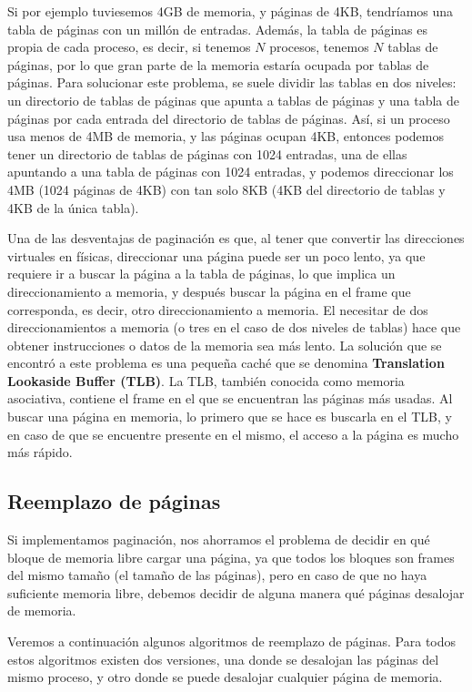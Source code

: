 \documentclass{article}
\begin{document}
Si por ejemplo tuviesemos 4GB de memoria, y p\'aginas de 4KB, tendr\'iamos una tabla de p\'aginas con un mill\'on de entradas. Adem\'as, la tabla de p\'aginas es propia de cada proceso, es decir, si tenemos $N$ procesos, tenemos $N$ tablas de p\'aginas, por lo que gran parte de la memoria estar\'ia ocupada por tablas de p\'aginas. Para solucionar este problema, se suele dividir las tablas en dos niveles: un directorio de tablas de p\'aginas que apunta a tablas de p\'aginas y una tabla de p\'aginas por cada entrada del directorio de tablas de p\'aginas. As\'i, si un proceso usa menos de 4MB de memoria, y las p\'aginas ocupan 4KB, entonces podemos tener un directorio de tablas de p\'aginas con 1024 entradas, una de ellas apuntando a una tabla de p\'aginas con 1024 entradas, y podemos direccionar los 4MB (1024 p\'aginas de 4KB) con tan solo 8KB (4KB del directorio de tablas y 4KB de la \'unica tabla).

Una de las desventajas de paginaci\'on es que, al tener que convertir las direcciones virtuales en f\'isicas, direccionar una p\'agina puede ser un poco lento, ya que requiere ir a buscar la p\'agina a la tabla de p\'aginas, lo que implica un direccionamiento a memoria, y despu\'es buscar la p\'agina en el frame que corresponda, es decir, otro direccionamiento a memoria. El necesitar de dos direccionamientos a memoria (o tres en el caso de dos niveles de tablas) hace que obtener instrucciones o datos de la memoria sea m\'as lento. La soluci\'on que se encontr\'o a este problema es una peque\~na cach\'e que se denomina \textbf{Translation Lookaside Buffer (TLB)}. La TLB, tambi\'en conocida como memoria asociativa, contiene el frame en el que se encuentran las p\'aginas m\'as usadas. Al buscar una p\'agina en memoria, lo primero que se hace es buscarla en el TLB, y en caso de que se encuentre presente en el mismo, el acceso a la p\'agina es mucho m\'as r\'apido.

\subsection{Reemplazo de p\'aginas}

Si implementamos paginaci\'on, nos ahorramos el problema de decidir en qu\'e bloque de memoria libre cargar una p\'agina, ya que todos los bloques son frames del mismo tama\~no (el tama\~no de las p\'aginas), pero en caso de que no haya suficiente memoria libre, debemos decidir de alguna manera qu\'e p\'aginas desalojar de memoria.

Veremos a continuaci\'on algunos algoritmos de reemplazo de p\'aginas. Para todos estos algoritmos existen dos versiones, una donde se desalojan las p\'aginas del mismo proceso, y otro donde se puede desalojar cualquier p\'agina de memoria.
\end{document}
